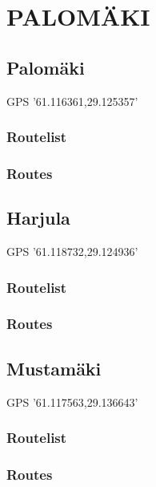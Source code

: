 \documentclass[8pt, a5paper,notitlepage,openany]{report}
\begin{document}



 \clearpage 
 \chapter{PALOMÄKI}
 \section{Palomäki}
   GPS '61.116361,29.125357'
\subsection{Routelist}

\newpage
\subsection{Routes}




 \clearpage
\section{Harjula}
 GPS '61.118732,29.124936'
\subsection{Routelist}

\newpage
\subsection{Routes}

 

 \clearpage
  \section{Mustamäki}
 GPS '61.117563,29.136643'
\subsection{Routelist}

\newpage
\subsection{Routes}


  
  
    
  
 
\end{document}
